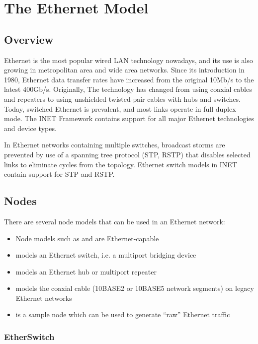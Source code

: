 \chapter{The Ethernet Model}
\label{cha:ethernet}

\section{Overview}

Ethernet is the most popular wired LAN technology nowadays, and its use is also
growing in metropolitan area and wide area networks. Since its introduction in
1980, Ethernet data transfer rates have increased from the original 10Mb/s to
the latest 400Gb/s. Originally, The technology has changed from using coaxial
cables and repeaters to using unshielded twisted-pair cables with hubs and
switches. Today, switched Ethernet is prevalent, and most links operate in full
duplex mode. The INET Framework contains support for all major Ethernet
technologies and device types.

In Ethernet networks containing multiple switches, broadcast storms are
prevented by use of a spanning tree protocol (STP, RSTP) that disables selected
links to eliminate cycles from the topology. Ethernet switch models in INET
contain support for STP and RSTP.

 \section{Nodes}

There are several node models that can be used in an Ethernet network:
 
\begin{itemize}
  \item Node models such as  and  are Ethernet-capable
  \item {} models an Ethernet switch, i.e. a multiport bridging device
  \item {} models an Ethernet hub or multiport repeater
  \item {} models the coaxial cable (10BASE2 or 10BASE5 network segments) on legacy Ethernet networks 
  \item {} is a sample node which can be used to generate ``raw'' Ethernet traffic
\end{itemize}


\subsection{EtherSwitch}

